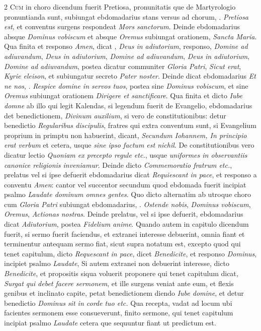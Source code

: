 \begin{multicols*}{2}
{\color{Red} }
\lettrine[lines=2]{\zallmancaps \color{Red} C}{um} in choro dicendum fuerit Pretiosa, pronunitatis que de Martyrologio pronuntianda sunt, subiungat ebdomadarius stans versus ad chorum, \Vbar . \textit{Pretiosa est}, et conventus surgens respondeat \textit{Mors sanctorum}. Deinde ebdomadarius absque \textit{Dominus vobiscum} et absque \textit{Oremus} subiungat orationem, \textit{Sancta Maria}. Qua finita et responso \textit{Amen}, dicat \Vbar , \textit{Deus in adiutorium}, responso, \textit{Domine ad adiuvandum}, \textit{Deus in adiutorium}, \textit{Domine ad adiuvandum}, \textit{Deus in adiutorium}, \textit{Domine ad adiuvandum}, postea dicatur communiter \textit{Gloria Patri}, \textit{Sicut erat}, \textit{Kyrie eleison}, et subiungatur secreto \textit{Pater noster}.
Deinde dicat ebdomadarius \textit{Et ne nos}, \Vbar . \textit{Respice domine in servos tuos}, postea sine \textit{Dominus vobiscum}, et sine \textit{Oremus} subiungat orationem \textit{Dirigere et sanctificare}.
Qua finita et dicto \textit{Iube domne} ab illo qui legit Kalendas, si legendum fuerit de Evangelio, ebdomadarius det benedictionem, \textit{Divinum auxilium}, si vero de constitutionibus: detur benedictio \textit{Regularibus discipulis}, fratres qui extra conventum sunt, si Evangelium proprium in primptu non habuerint, dicant, \textit{Secundum Iohannem, In principio erat verbum} et cetera, usque \textit{sine ipso factum est nichil}. De constitutionibus vero dicatur lectio \textit{Quoniam ex precepto regule etc.}, usque \textit{uniformes in observantiis canonice religionis inveniamur}. Deinde dicto \textit{Commemoratio fratrum etc.}, prelatus vel si ipse defuerit ebdomadarius dicat \textit{Requiescant in pace}, et responso a conventu \textit{Amen}: cantor vel succentor secundum quod ebdomada fuerit incipiat psalmo \textit{Laudate dominum omnes gentes}. Quo dicto alternatim ab utroque choro cum \textit{Gloria Patri} subiungat ebdomadarius, \Vbar . \textit{Ostende nobis}, \textit{Dominus vobiscum}, \textit{Oremus}, \textit{Actionas nostras}. Deinde prelatus, vel si ipse defuerit, ebdomadarius dicat \textit{Adiutorium}, postea \textit{Fidelium anime}.
Quando autem in capitulo dicendum fuerit, si sermo fuerit faciendus, et extranei interesse debuerint, omnia fiant et terminentur antequam sermo fiat, sicut supra notatum est, excepto quod qui tenet capitulum, dicto \textit{Requescant in pace}, dicet \textit{Benedicite}, et responso \textit{Dominus}, incipiet psalmo \textit{Laudate}, Si autem extranei non debuerint interesse, dicto \textit{Benedicite}, et propositis siqua voluerit proponere qui tenet capitulum dicat, \textit{Surgat qui debet facere sermonem}, et ille surgens veniat ante eum, et flexis genibus et inclinato capite, petat benedictionem diendo \textit{Iube domine}, et detur benedictio \textit{Dominus sit in corde tuo etc.} Qua recepta, vadat ad locum ubi facientes sermonem esse consueverunt, finito sermone, qui tenet capitulum incipiat psalmo \textit{Laudate} cetera que sequuntur fiant ut predictum est.

\end{multicols*}
